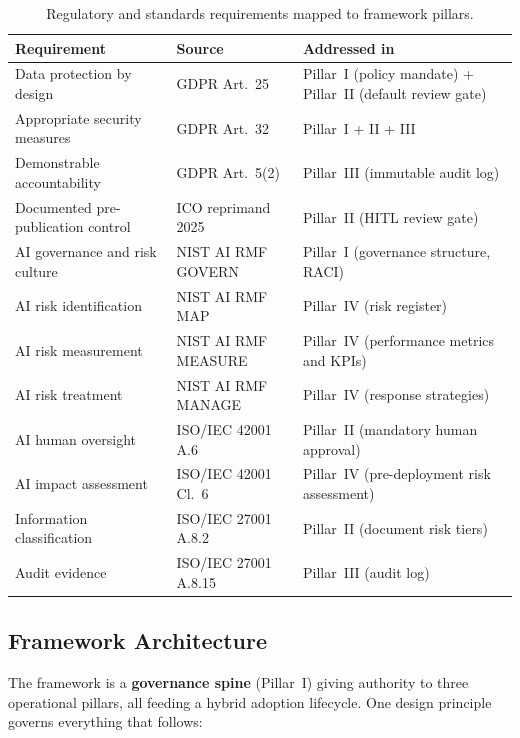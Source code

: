 \documentclass[12pt,a4paper]{article}
\begin{document}
\begin{table}[H]
\centering
\small
{}
\begin{tabular}{@{} p{4.3cm} p{3.5cm} p{5.7cm} @{}}
\toprule
\textbf{\color{accentdark}Requirement} & \textbf{\color{accentdark}Source} & \textbf{\color{accentdark}Addressed in} \\
\midrule
Data protection by design & GDPR Art.~25 & Pillar~I (policy mandate) + Pillar~II (default review gate) \\
Appropriate security measures & GDPR Art.~32 & Pillar~I + II + III \\
Demonstrable accountability & GDPR Art.~5(2) & Pillar~III (immutable audit log) \\
Documented pre-publication control & ICO reprimand 2025 & Pillar~II (HITL review gate) \\
AI governance and risk culture & NIST AI RMF GOVERN & Pillar~I (governance structure, RACI) \\
AI risk identification & NIST AI RMF MAP & Pillar~IV (risk register) \\
AI risk measurement & NIST AI RMF MEASURE & Pillar~IV (performance metrics and KPIs) \\
AI risk treatment & NIST AI RMF MANAGE & Pillar~IV (response strategies) \\
AI human oversight & ISO/IEC 42001 A.6 & Pillar~II (mandatory human approval) \\
AI impact assessment & ISO/IEC 42001 Cl.~6 & Pillar~IV (pre-deployment risk assessment) \\
Information classification & ISO/IEC 27001 A.8.2 & Pillar~II (document risk tiers) \\
Audit evidence & ISO/IEC 27001 A.8.15 & Pillar~III (audit log) \\
\bottomrule
\end{tabular}
\caption{Regulatory and standards requirements mapped to framework pillars.}
\label{tab:standards}
\end{table}

\subsection{Framework Architecture}
\label{sec:architecture}

The framework is a \textbf{governance spine} (Pillar~I) giving authority to three operational pillars, all feeding a hybrid adoption lifecycle. One design principle governs everything that follows:
\end{document}
